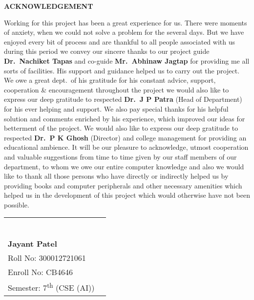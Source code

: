 

\begin{center}
  \Large\textbf{ACKNOWLEDGEMENT}
\end{center}

\begin{justify}
  \linespread{1.5}
  \normalsize 
 Working for this project has been a great experience for us. There were moments of anxiety, when we could not solve a problem for the several days. But we have enjoyed every bit of process and are thankful to all people associated with us during this period we convey our sincere thanks to our project guide \textbf{Dr.\ Nachiket Tapas} and co-guide \textbf{Mr.\ Abhinaw Jagtap} for providing me all sorts of facilities. His support and guidance helped us to carry out the project. We owe a great dept.\ of his gratitude for his constant advice, support, cooperation \& encouragement throughout the project we would also like to express our deep gratitude to respected \textbf{Dr.\ J P Patra} (Head of Department) for his ever helping and support. We also pay special thanks for his helpful solution and comments enriched by his experience, which improved our ideas for betterment of the project. We would also like to express our deep gratitude to respected \textbf{Dr.\ P K Ghosh} (Director) and college management for providing an educational ambience. It will be our pleasure to acknowledge, utmost cooperation and valuable suggestions from time to time given by our staff members of our department, to whom we owe our entire computer knowledge and also we would like to thank all those persons who have directly or indirectly helped us by providing books and computer peripherals and other necessary amenities which helped us in the development of this project which would otherwise have not been possible.
\end{justify}


\vspace{2cm}


\normalsize 

\noindent
\begin{tabular}{p{} @{\hspace{2.4cm}} p{}}
  &
  \centering
  \rule{4cm}{0.4pt} \\
  \textbf{Jayant Patel} \\
  Roll No: 300012721061 \\
  Enroll No: CB4646 \\
  Semester: 7\textsuperscript{th} (CSE (AI)) \\
\end{tabular}
